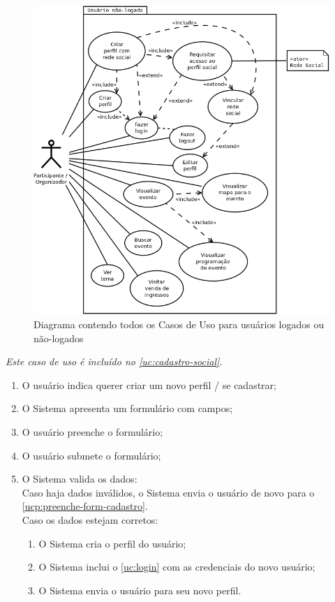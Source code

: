 \documentclass[12pt,a4paper,twoside,hyphens,english,brazil]{abntex2}
\begin{document}
{\begin{figure}[!ht]
\centering
	\includegraphics[width=0.86\linewidth]{diagramas/uc-nao-logado.png}
	\caption{Diagrama contendo todos os Casos de Uso para usuários logados ou não-logados}
	\label{diag:uc-nao-logado}
\end{figure}

\emph{Este caso de uso é incluído no \ref{uc:cadastro-social}.}
\begin{enumerate}[itemsep=-1ex,topsep=-1ex]
	\item O usuário indica querer criar um novo perfil / se cadastrar;
	\item O Sistema apresenta um formulário com campos; \label{ucp:preenche-form-cadastro}
	\item O usuário preenche o formulário;
	\item O usuário submete o formulário;
	\item O Sistema valida os dados:
		\\Caso haja dados inválidos, o Sistema envia o usuário de novo para o \autoref{ucp:preenche-form-cadastro}.
		\\Caso os dados estejam corretos:
			\begin{enumerate}[itemsep=-1ex,topsep=-1ex]
				\item O Sistema cria o perfil do usuário;
				\item O Sistema inclui o \ref{uc:login} com as credenciais do novo usuário;
				\item O Sistema envia o usuário para seu novo perfil.
			\end{enumerate}
\end{enumerate}

}
\end{document}
